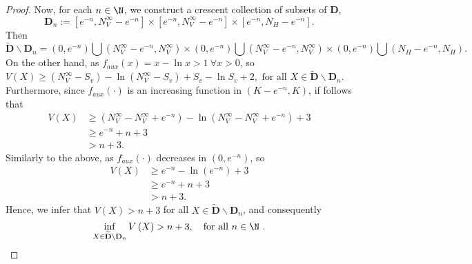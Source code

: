 \begin{proof}
    Now, for each $n \in \N$, we construct a crescent collection of subsets of 
    $\mathbf{D}$,
    $$
        \mathbf{D}_{n} :=
        [e^{-n}, N_{V}^{\infty} - e^{-n}] \times
        [e^{-n}, N_{V}^{\infty} - e^{-n}] \times
        [e^{-n}, N_{H} - e^{-n}].
    $$
    Then
    $$
        \widetilde{\mathbf{D}}
        \backslash\mathbf{D}_{n} 
        = 
        \left(
            0,e^{-n}
        \right)
        \bigcup
        \left(
            N_{V}^{\infty} - e^{-n},N_{V}^{\infty}
        \right)
	\times 
	\left(0,e^{-n}\right)
	\bigcup\left(N_{V}^{\infty} - e^{-n},N_{V}^{\infty}\right)
	\times
	\left(0,e^{-n}\right)
	\bigcup\left(N_{H} - e^{-n},N_{H}\right) .
	$$
	On the other hand, as $f_{aux}(x) = x - \ln x > 1 \ \forall x > 0$, so 
	$V\left(X\right)\geq (N_{V}^{\infty} - S_{v}) - \ln(N_{V}^{\infty} - S_{v}) 
	+ S_{v} - \ln S_{v} + 2, \text{ for all }X\in \widetilde{\mathbf{D}} 
	\backslash \mathbf{D}_{n}$. Furthermore, since $f_{aux}(\cdot)$ is 
	an increasing function in $(K-e^{-n},K)$, if follows that
	\begin{equation*}
	\begin{aligned}
	V(X)
	&\geq 
	(N_{V}^{\infty} - N_{V}^{\infty} + e^{-n})- \ln(N_{V}^{\infty} - 
	N_{V}^{\infty} + e^{-n}) + 3\\
	&\geq e^{-n} + n + 3\\
	&> n + 3.
	\end{aligned}
	\end{equation*}
	Similarly to the above, as $f_{aux}(\cdot)$ decreases in $(0,e^{-n})$, so
	\begin{equation*}
	\begin{aligned}
	V(X)
	& \geq e^{-n}- \ln(e^{-n}) + 3 \\
	& \geq e^{-n} + n + 3 \\
	& > n + 3.
	\end{aligned}
	\end{equation*}
	Hence, we infer that $V\left(X\right) > n + 3$ for all $X	\in 
	\widetilde{\mathbf{D}} \backslash\mathbf{D}_{n}$, and consequently
	\begin{equation}\label{eqn:v_condition}
	\inf_{
		X
		\in 
		\widetilde{\mathbf{D}}
		\backslash
		\mathbf{D}_{n}}
	V
	\left( X \right) 
	> n + 3, \quad \text{for all } n\in \N ~.
	\end{equation}
	

\end{proof}

